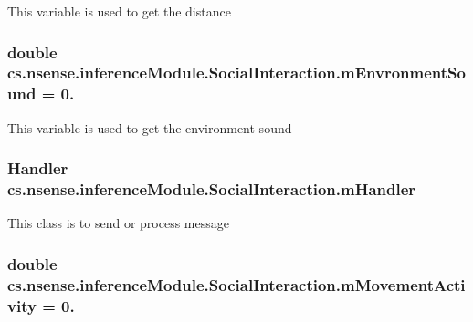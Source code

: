 This variable is used to get the distance \hypertarget{classcs_1_1nsense_1_1inference_module_1_1_social_interaction_a63536bd91de705c47a2ff24deff84f36}{
\subsubsection[{m\-Envronment\-Sound}]{\setlength{\rightskip}{0pt plus 5cm}double cs.\-nsense.\-inference\-Module.\-Social\-Interaction.\-m\-Envronment\-Sound = 0.\hspace{0.3cm}{\ttfamily [static]}}}\label{classcs_1_1nsense_1_1inference_module_1_1_social_interaction_a63536bd91de705c47a2ff24deff84f36}
This variable is used to get the environment sound \hypertarget{classcs_1_1nsense_1_1inference_module_1_1_social_interaction_a559c79ab481a825dbdd096c67983293f}{
\subsubsection[{m\-Handler}]{\setlength{\rightskip}{0pt plus 5cm}Handler cs.\-nsense.\-inference\-Module.\-Social\-Interaction.\-m\-Handler\hspace{0.3cm}{\ttfamily [private]}}}\label{classcs_1_1nsense_1_1inference_module_1_1_social_interaction_a559c79ab481a825dbdd096c67983293f}
This class is to send or process message \hypertarget{classcs_1_1nsense_1_1inference_module_1_1_social_interaction_a82ce9d45646e36547602fb66bb866f27}{
\subsubsection[{m\-Movement\-Activity}]{\setlength{\rightskip}{0pt plus 5cm}double cs.\-nsense.\-inference\-Module.\-Social\-Interaction.\-m\-Movement\-Activity = 0.\hspace{0.3cm}{\ttfamily [static]}}}\label{classcs_1_1nsense_1_1inference_module_1_1_social_interaction_a82ce9d45646e36547602fb66bb866f27}
